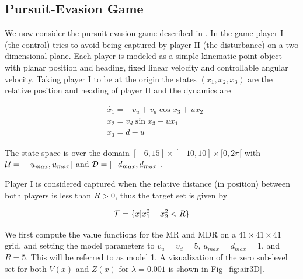 \subsection{Pursuit-Evasion Game}

We now consider the pursuit-evasion game described in \cite{Mitchell2005}. In the game player I (the control) tries to avoid being captured by player II (the disturbance) on a two dimensional plane. Each player is modeled as a simple kinematic point object with planar position and heading, fixed linear velocity and controllable angular velocity. Taking player I to be at the origin the states $(x_1, x_2, x_3)$ are the relative position and heading of player II and the dynamics are

\begin{equation}
\begin{split}
&\dot{x_1}= -v_u+v_d \cos x_3 + ux_2\\ 
&\dot{x_2}= v_d \sin x_3 - ux_1\\ 
&\dot{x_3}= d-u
\end{split}
\end{equation}

The state space is over the domain $[-6,15] \times [-10,10] \times [0,2\pi[$ with $\mathcal{U}=[-u_{max},u_{max}]$ and $\mathcal{D}=[-d_{max}, d_{max}]$. 

Player I is considered captured when the relative distance (in position) between both players is less than $R>0$, thus the target set is given by

\begin{equation}
\mathcal{T}= \{x| x_1^{2}+x_2^2 < R\}
\end{equation}


We first compute the value functions for the MR and MDR on a $41 \times 41 \times 41$ grid, and setting the model parameters to $v_u=v_d=5$, $u_{max}=d_{max}=1$, and $R=5$. This will be referred to as model 1. A visualization of the zero sub-level set for both $V(x)$ and $Z(x)$ for $\lambda=0.001$ is shown in Fig~\ref{fig:air3D}.


